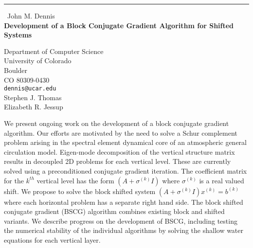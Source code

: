 \documentclass{report}
\begin{document}
\begin{center}
\rule{6in}{1pt} \
{\large John M. Dennis \\
{\bf Development of a Block Conjugate Gradient Algorithm for Shifted Systems}}

Department of Computer Science  \\ University of Colorado \\ Boulder \\ CO 80309-0430
\\
{\tt dennis@ucar.edu}\\
Stephen J. Thomas\\
Elizabeth R. Jessup\end{center}

We present ongoing work on the development of a block conjugate gradient
algorithm. Our efforts are motivated by the need to solve a Schur
complement problem arising in the spectral element dynamical core of an
atmospheric general circulation model. Eigen-mode decomposition of the
vertical structure matrix results in decoupled 2D problems for each
vertical level. These are currently solved using a preconditioned
conjugate gradient iteration. The coefficient matrix for the $k^{th}$
vertical level has the form
$(A + \sigma^{(k)} I)$ where $\sigma^{(k)}$ is a real valued shift. We
propose to solve the block shifted system $(A + \sigma^{(k)} I) x^{(k)} =
b^{(k)}$ where each horizontal problem has a separate right hand side.
The block shifted conjugate gradient (BSCG) algorithm combines existing
block and shifted variants. We describe progress on the development of
BSCG, including testing the numerical stability of the individual
algorithms by solving the shallow water equations for each vertical
layer.
\end{document}

